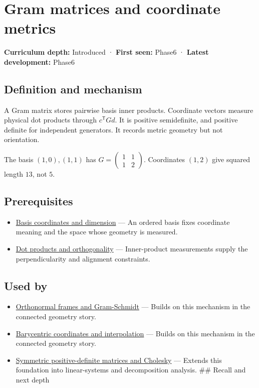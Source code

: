 \hypertarget{appendix-3b863809f82a}{}\label{referencestart:appendix-3b863809f82a}
\section{Gram matrices and coordinate metrics}\label{appendix-3b863809f82a-gram-matrices-and-coordinate-metrics}

\textbf{Curriculum depth:} Introduced · \textbf{First seen:} Phase6 · \textbf{Latest development:} Phase6

\subsection{Definition and mechanism}\label{appendix-3b863809f82a-definition-and-mechanism}

A Gram matrix stores pairwise basis inner products. Coordinate vectors measure physical dot products through \(c^\mathsf TGd\). It is positive semidefinite, and positive definite for independent generators. It records metric geometry but not orientation.

The basis \((1,0),(1,1)\) has \(G=\begin{pmatrix}1&1\\1&2\end{pmatrix}\). Coordinates \((1,2)\) give squared length \(13\), not \(5\).

\subsection{Prerequisites}\label{appendix-3b863809f82a-prerequisites}

\begin{itemize}
\tightlist
\item
  \hyperref[appendix-ce0341f7ea0d]{Basis coordinates and dimension} --- An ordered basis fixes coordinate meaning and the space whose geometry is measured.
\item
  \hyperref[appendix-8bc4e8fc547c]{Dot products and orthogonality} --- Inner-product measurements supply the perpendicularity and alignment constraints.
\end{itemize}

\subsection{Used by}\label{appendix-3b863809f82a-used-by}

\begin{itemize}
\tightlist
\item
  \hyperref[appendix-c39f1ed34271]{Orthonormal frames and Gram-Schmidt} --- Builds on this mechanism in the connected geometry story.
\item
  \hyperref[appendix-02b9d9a81dca]{Barycentric coordinates and interpolation} --- Builds on this mechanism in the connected geometry story.
\item
  \hyperref[appendix-50d2ea3c9b26]{Symmetric positive-definite matrices and Cholesky} --- Extends this foundation into linear-systems and decomposition analysis. \#\# Recall and next depth
\end{itemize}

